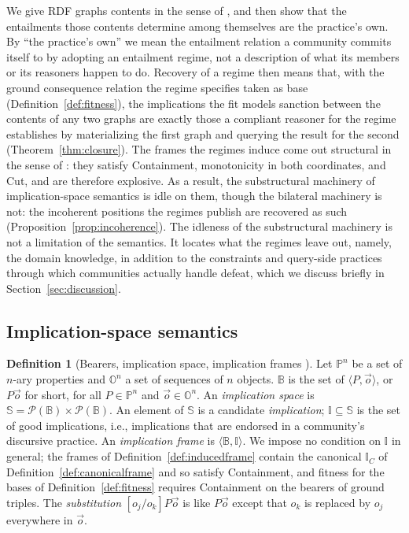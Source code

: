 \documentclass[12pt]{article}
\newcommand{\B}{\mathbb{B}}   %
\newcommand{\I}{\mathbb{I}}
\theoremstyle{definition}
\newtheorem{definition}{Definition}
\newcommand{\tuple}[1]{\langle #1 \rangle}
\newcommand{\Sp}{\mathbb{S}}    %
\newcommand{\Pbb}{\mathbb{P}}   %
\newcommand{\Obb}{\mathbb{O}}   %
\begin{document}
We give RDF graphs contents in the sense of \citet{hlobil2025reasons}, and then show that the entailments those contents determine among themselves are the practice's own. By ``the practice's own'' we mean the entailment relation a community commits itself to by adopting an entailment regime, not a description of what its members or its reasoners happen to do. Recovery of a regime then means that, with the ground consequence relation the regime specifies taken as base (Definition~\ref{def:fitness}), the implications the fit models sanction between the contents of any two graphs are exactly those a compliant reasoner for the regime establishes by materializing the first graph and querying the result for the second (Theorem~\ref{thm:closure}). The frames the regimes induce come out structural in the sense of \citet[Def.~30]{hlobil2026firstorder}: they satisfy Containment, monotonicity in both coordinates, and Cut, and are therefore explosive. As a result, the substructural machinery of implication-space semantics is idle on them, though the bilateral machinery is not: the incoherent positions the regimes publish are recovered as such (Proposition~\ref{prop:incoherence}). The idleness of the substructural machinery is not a limitation of the semantics. It locates what the regimes leave out, namely, the domain knowledge, in addition to the constraints and query-side practices through which communities actually handle defeat, which we discuss briefly in Section~\ref{sec:discussion}.

\subsection{Implication-space semantics}
\label{sec:machinery}

\begin{definition}[Bearers, implication space, implication frames {\citep{hlobil2026firstorder}}]
\label{def:bearers}
Let $\Pbb^{n}$ be a set of $n$-ary properties and $\Obb^{n}$ a set of sequences of $n$ objects. $\B$ is the set of $\tuple{P, \vec{o}}$, or $P\vec{o}$ for short, for all $P \in \Pbb^{n}$ and $\vec{o} \in \Obb^{n}$. An \textit{implication space} is $\Sp = \mathcal{P}(\B) \times \mathcal{P}(\B)$. An element of $\Sp$ is a candidate \textit{implication}; $\I \subseteq \Sp$ is the set of good implications, i.e., implications that are endorsed in a community's discursive practice. An \textit{implication frame} is $\tuple{\B, \I}$. We impose no condition on $\I$ in general; the frames of Definition~\ref{def:inducedframe} contain the canonical $\I_C$ of Definition~\ref{def:canonicalframe} and so satisfy Containment, and fitness for the bases of Definition~\ref{def:fitness} requires Containment on the bearers of ground triples. The \textit{substitution} $[o_j / o_k]P\vec{o}$ is like $P\vec{o}$ except that $o_k$ is replaced by $o_j$ everywhere in $\vec{o}$.
\end{definition}
\end{document}
